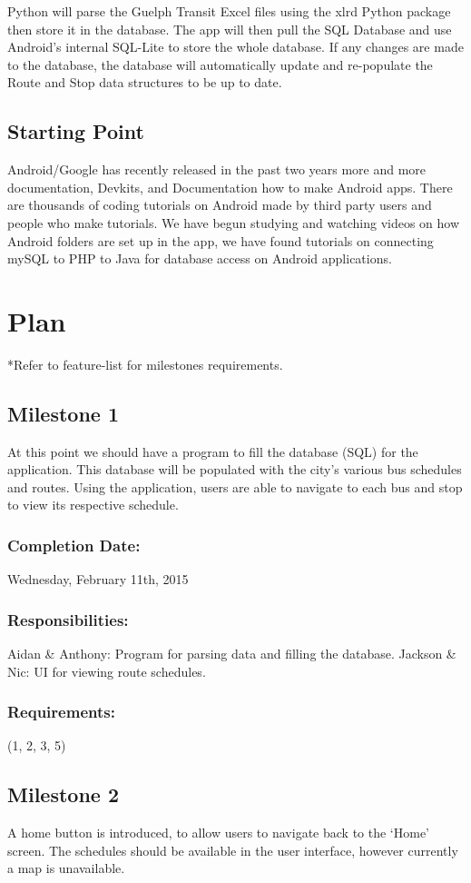 \documentclass[a4paper,12pt]{article}
\begin{document}
Python will parse the Guelph Transit Excel files using the xlrd Python package then store it in the database. The app will then pull the SQL Database and use Android's internal SQL-Lite to store the whole database. If any changes are made to the database, the database will automatically update and re-populate the Route and Stop data structures to be up to date.
 
 
\subsection{Starting Point}
	Android/Google has recently released in the past two years more and more documentation, Devkits, and Documentation how to make Android apps. There are thousands of
coding tutorials on Android made by third party users and people who make tutorials. 
We have begun studying and watching videos on how Android folders are set up in the app,
we have found tutorials on connecting mySQL to PHP to Java for database access on Android
applications. 

\pagebreak

\section{Plan}
*Refer to feature-list for milestones requirements.
\subsection{Milestone 1}
At this point we should have a program to fill the database (SQL) for the application. This database will be populated with the city's various bus schedules and routes. Using the application, users are able to navigate to each bus and stop to view its respective schedule. 
\subsubsection{Completion Date:} Wednesday, February 11th, 2015
\subsubsection{Responsibilities:}
Aidan \& Anthony: Program for parsing data and filling the database.
Jackson \& Nic: UI for viewing route schedules.
\subsubsection{Requirements:} (1, 2, 3, 5)

\subsection{Milestone 2}
A home button is introduced, to allow users to navigate back to the ‘Home’ screen. The schedules should be available in the user interface, however currently a map is unavailable.
\end{document}
